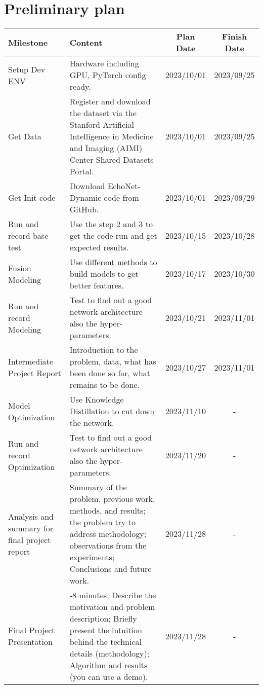 \section{Preliminary plan}
\label{sec:formatting}

\noindent
\begin{minipage}{0.5\textwidth}
    \fontsize{7}{10}\selectfont
    \begin{tabular}{|>{\raggedright\arraybackslash}m{1cm}|>{\raggedright\arraybackslash}m{3cm}|c|c|}
        \hline
        \rowcolor{myblue} \color{white} Milestone & \color{white} Content & \color{white} Plan Date & \color{white} Finish Date \\
        \hline
        Setup Dev ENV & Hardware including GPU, PyTorch config ready. & 2023/10/01 & 2023/09/25\\
        \hline
        Get Data & Register and download the dataset via the Stanford Artificial Intelligence in Medicine and Imaging (AIMI) Center Shared Datasets Portal. & 2023/10/01 & 2023/09/25\\
        \hline
        Get Init code & Download EchoNet-Dynamic code from GitHub. & 2023/10/01 & 2023/09/29\\
        \hline
        Run and record base test & Use the step 2 and 3 to get the code run and get expected results. & 2023/10/15 & 2023/10/28\\
        \hline
        Fusion Modeling & Use different methods to build models to get better features. & 2023/10/17 & 2023/10/30\\
        \hline
        Run and record Modeling & Test to find out a good network architecture also the hyper-parameters. & 2023/10/21 & 2023/11/01\\
        \hline
        Intermediate Project Report & Introduction to the problem, data, what has been done so far, what remains to be done. & 2023/10/27 & 2023/11/01\\
        \hline
        Model Optimization & Use Knowledge Distillation to cut down the network. & 2023/11/10 & -\\
        \hline
        Run and record Optimization & Test to find out a good network architecture also the hyper-parameters. & 2023/11/20 & -\\
        \hline
        Analysis and summary for final project report & Summary of the problem, previous work, methods, and results; the problem try to address methodology; observations from the experiments; Conclusions and future work. & 2023/11/28 & -\\
        \hline
        Final Project Presentation & 5-8 minutes; Describe the motivation and problem description; Briefly present the intuition behind the technical details (methodology); Algorithm and results (you can use a demo). & 2023/11/28 & -\\
        \hline
    \end{tabular}
\end{minipage}%
